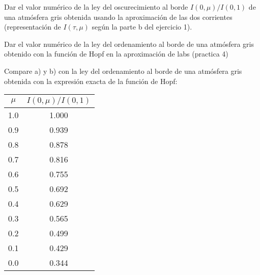 \documentclass[12pt,spanish,a4paper]{practice}
\begin{document}
    \begin{problem}\label{prob:5}

        \begin{ppart}\label{prob:5:a}
            Dar el valor numérico de la ley del oscurecimiento al borde $I(0,\mu)/I(0,1)$ de una atmósfera gris obtenida usando la aproximación de las dos corrientes (representación de $I(\tau,\mu)$ según la parte b del ejercicio 1).
        \end{ppart}

        \begin{ppart}\label{prob:5:b}
            Dar el valor numérico de la ley del ordenamiento al borde de una atmósfera gris obtenido con la función de Hopf en la aproximación de labs (practica 4)
        \end{ppart}

        \begin{ppart}\label{prob:5:c}
            Compare a) y b) con la ley del ordenamiento al borde de una atmósfera gris obtenida con la expresión exacta de la función de Hopf:


        \end{ppart}
            \begin{table}[h!]
            \centering
                \begin{tabular}{c|c}

                     $\mu$ & $I(0,\mu)/I(0,1)$ \\ [0.5ex]
                     \hline
                     1.0 & 1.000   \\
                     0.9 & 0.939   \\
                     0.8 & 0.878  \\
                     0.7 & 0.816  \\
                     0.6 & 0.755  \\
                     0.5 & 0.692  \\
                     0.4 & 0.629  \\
                     0.3 & 0.565  \\
                     0.2 & 0.499  \\
                     0.1 & 0.429 \\
                     0.0 & 0.344 \\ [1ex]

                \end{tabular}
            \end{table}

    \end{problem}
\end{document}
